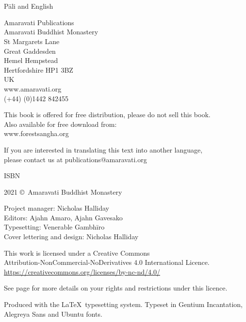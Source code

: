 
\thispagestyle{empty}

\enlargethispage{\baselineskip}

{\centering
\ifaivedition
\fontsize{12}{15}\selectfont
\else
\small
\fi
\setlength{\parskip}{15pt}

{\normalsize
\thetitle\\
\thesubtitle\\
Pāli and English}

Amaravati Publications\\
Amaravati Buddhist Monastery\\
St Margarets Lane\\
Great Gaddesden\\
Hemel Hempstead\\
Hertfordshire HP1 3BZ\\
UK\\
www.amaravati.org\\
(+44) (0)1442 842455

This book is offered for free distribution, please do not sell this book.\\
Also available for free download from:\\
www.forestsangha.org

If you are interested in translating this text into another language,\\
please contact us at publications@amaravati.org

ISBN \theISBN

2021 \copyright\ Amaravati Buddhist Monastery

Project manager: Nicholas Halliday\\
Editors: Ajahn Amaro, Ajahn Gavesako\\
Typesetting: Venerable Gambhīro\\
Cover lettering and design: Nicholas Halliday

\vfill

This work is licensed under a Creative Commons\\
Attribution-NonCommercial-NoDerivatives 4.0 International Licence.\\
\href{https://creativecommons.org/licenses/by-nc-nd/4.0/}{https://creativecommons.org/licenses/by-nc-nd/4.0/}

See page \pageref{copyright-details} for more details on your rights and restrictions under this licence.

Produced with the \LaTeX\ typesetting system. Typeset in Gentium Incantation,\\
Alegreya Sans and Ubuntu fonts.

\theEditionInfo


}

